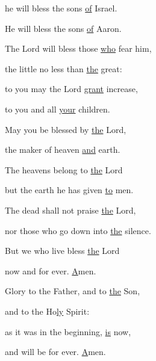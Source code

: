 he will bless the sons \uline{of} Israel.~\GreStar{}~\nopagebreak

He will bless the sons \uline{of} Aaron.



\noindent The Lord will bless those \uline{who} fear him,~\GreStar{}~\nopagebreak

the little no less than \uline{the} great:

\noindent to you may the Lord \uline{grant} increase,~\GreStar{}~\nopagebreak

to you and all \uline{your} children.



\noindent May you be blessed by \uline{the} Lord,~\GreStar{}~\nopagebreak

the maker of heaven \uline{and} earth.

\noindent The heavens belong to \uline{the} Lord~\GreStar{}~\nopagebreak

but the earth he has given \uline{to} men.



\noindent The dead shall not praise \uline{the} Lord,~\GreStar{}~\nopagebreak

nor those who go down into \uline{the} silence.

\noindent But we who live bless \uline{the} Lord~\GreStar{}~\nopagebreak

now and for ever. \uline{A}men.


\noindent Glory to the Father, and to \uline{the} Son,~\GreStar{}~\nopagebreak

and to the Ho\uline{ly} Spirit:

\noindent as it was in the beginning, \uline{is} now,~\GreStar{}~\nopagebreak

and will be for ever. \uline{A}men.
